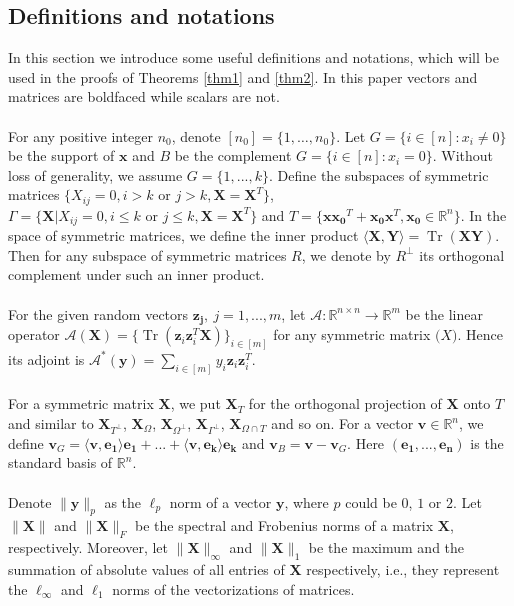 \documentclass[11pt]{article}
\newcommand{\R}{\mathbb{R}}
\newcommand{\<}{\langle}
\renewcommand{\>}{\rangle}
\newcommand{\goto}{\rightarrow}
\newcommand{\vct}[1]{\bm{#1}}
\newcommand{\mtx}[1]{\bm{#1}}
\newcommand{\tr}{\operatorname{Tr}}
\numberwithin{equation}{section}
\newcommand{\cA}{\mathcal{A}}
\begin{document}
\subsection{Definitions and notations}
In this section we introduce some useful definitions and notations, which will be used in the proofs of Theorems \ref{thm1} and \ref{thm2}. In this paper vectors and matrices are boldfaced while scalars are not. \\
\\
For any positive integer $n_0$, denote $[n_0] = \{1, \ldots, n_0\}$. Let $G=\{i \in [n]: x_i\neq 0\}$ be the support of $\vct{x}$ and $B$ be the complement $G=\{i \in [n]: x_i= 0\}$. Without loss of generality, we assume $G=\{1,...,k\}$. Define the subspaces of symmetric matrices $\{X_{ij}=0, i>k \text{~or~}j>k, \mtx{X}=\mtx{X}^T\}$, $\Gamma=\{\mtx{X}|X_{ij}=0, i\leq k \text{~or~}j\leq k, \mtx{X}=\mtx{X}^T\}$ and $T=\{\vct{x}\vct{x_0}^T+\vct{x_0}\vct{x}^T, \vct{x_0} \in \mathbb{R}^n\}$. In the space of symmetric matrices, we define the inner product $\langle \mtx{X}, \mtx{Y}\rangle=\tr(\mtx{X}\mtx{Y})$. Then for any subspace of symmetric matrices $R$, we denote by $R^\perp$ its orthogonal complement under such an inner product.\\
\\
For the given random vectors $\vct{z_j}, ~j=1,...,m$, let
$\cA: \R^{n \times n} \goto \R^m$ be the linear operator $\cA(\mtx{X}) =
\{\tr(\vct{z}_i \vct{z}_i^T \mtx{X})\}_{i \in [m]}$ for any symmetric matrix $\mtx(X)$. Hence its adjoint is $\cA^*(\vct{y}) = \sum_{i \in [m]} y_i \vct{z}_i
\vct{z}_i^T$. \\
\\
For a symmetric matrix $\mtx{X}$, we put
$\mtx{X}_T$ for the orthogonal projection of $\mtx{X}$ onto $T$ and
similar to $\mtx{X}_{T^\perp}$, $\mtx{X}_{\Omega}$, $\mtx{X}_{\Omega^\perp}$, $\mtx{X}_{\Gamma^\perp}$, $\mtx{X}_
{\Omega \cap T}$ and so on.
For a vector $\vct{v} \in \mathbb{R}^n$, we define $\vct{v}_G=\langle \vct{v}, \vct{e_1} \rangle \vct{e_1}+...+\langle \vct
{v}, \vct{e_k} \rangle \vct{e_k}$ and $\vct{v}_B=\vct{v}-\vct{v}_G$. Here $(\vct{e_1}, ..., \vct{e_n})$ is the 
standard 
basis of $\mathbb{R}^n$.\\
\\
Denote $\|\vct{y}\|_p$ as the $\ell_p$ norm of a
vector $\vct{y}$, where $p$ could be $0$, $1$ or $2$. 
Let $\|\mtx{X}\|$ and  $\|\mtx{X}\|_F$ be the
spectral and Frobenius norms of a matrix $\mtx{X}$, respectively. Moreover, let $\|\mtx{X}\|_\infty$ and $\|\mtx{X}\|_1$ be the 
maximum and the summation of absolute values of all entries of $\mtx{X}$ respectively, i.e., they represent the $\ell_\infty$ and $\ell_1$ norms of the vectorizations of matrices.
\end{document}
